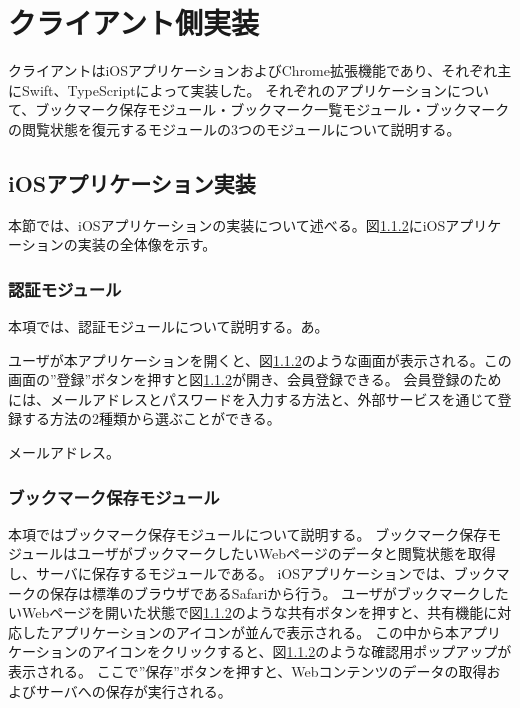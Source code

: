 \section{クライアント側実装}
クライアントはiOSアプリケーションおよびChrome拡張機能であり、それぞれ主にSwift、TypeScriptによって実装した。
それぞれのアプリケーションについて、ブックマーク保存モジュール・ブックマーク一覧モジュール・ブックマークの閲覧状態を復元するモジュールの3つのモジュールについて説明する。

\subsection{iOSアプリケーション実装}
本節では、iOSアプリケーションの実装について述べる。図\ref{}にiOSアプリケーションの実装の全体像を示す。

\subsubsection{認証モジュール}
本項では、認証モジュールについて説明する。あ。

ユーザが本アプリケーションを開くと、図\ref{}のような画面が表示される。この画面の”登録”ボタンを押すと図\ref{}が開き、会員登録できる。
会員登録のためには、メールアドレスとパスワードを入力する方法と、外部サービスを通じて登録する方法の2種類から選ぶことができる。

メールアドレス。





\subsubsection{ブックマーク保存モジュール}
本項ではブックマーク保存モジュールについて説明する。
ブックマーク保存モジュールはユーザがブックマークしたいWebページのデータと閲覧状態を取得し、サーバに保存するモジュールである。
iOSアプリケーションでは、ブックマークの保存は標準のブラウザであるSafariから行う。
ユーザがブックマークしたいWebページを開いた状態で図\ref{}のような共有ボタンを押すと、共有機能に対応したアプリケーションのアイコンが並んで表示される。
この中から本アプリケーションのアイコンをクリックすると、図\ref{}のような確認用ポップアップが表示される。
ここで”保存”ボタンを押すと、Webコンテンツのデータの取得およびサーバへの保存が実行される。

